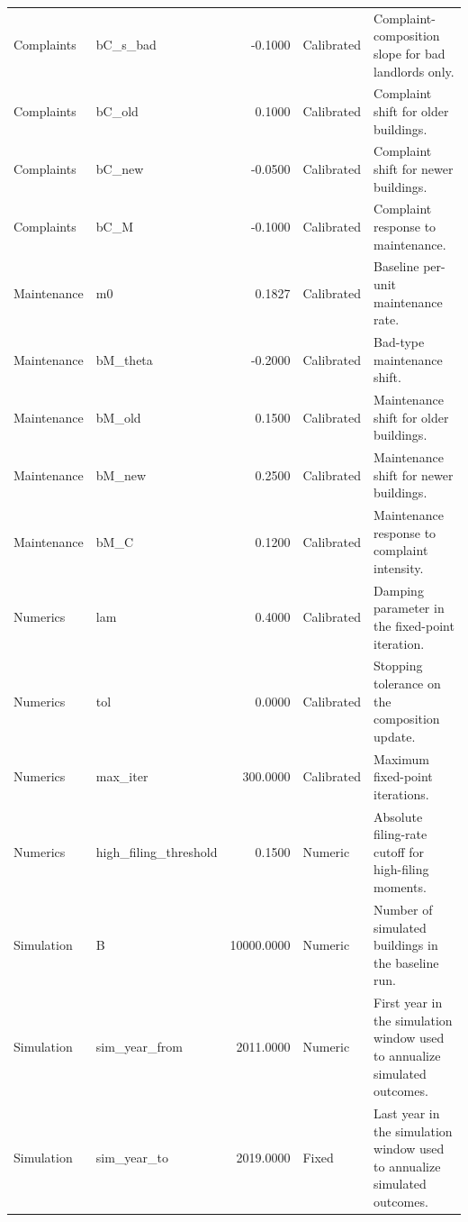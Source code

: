 \begin{table}
\begin{tabular}[t]{llrll}
Complaints & bC\_s\_bad & -0.1000 & Calibrated & Complaint-composition slope for bad landlords only.\\
Complaints & bC\_old & 0.1000 & Calibrated & Complaint shift for older buildings.\\
Complaints & bC\_new & -0.0500 & Calibrated & Complaint shift for newer buildings.\\
Complaints & bC\_M & -0.1000 & Calibrated & Complaint response to maintenance.\\
Maintenance & m0 & 0.1827 & Calibrated & Baseline per-unit maintenance rate.\\
Maintenance & bM\_theta & -0.2000 & Calibrated & Bad-type maintenance shift.\\
Maintenance & bM\_old & 0.1500 & Calibrated & Maintenance shift for older buildings.\\
Maintenance & bM\_new & 0.2500 & Calibrated & Maintenance shift for newer buildings.\\
Maintenance & bM\_C & 0.1200 & Calibrated & Maintenance response to complaint intensity.\\
Numerics & lam & 0.4000 & Calibrated & Damping parameter in the fixed-point iteration.\\
Numerics & tol & 0.0000 & Calibrated & Stopping tolerance on the composition update.\\
Numerics & max\_iter & 300.0000 & Calibrated & Maximum fixed-point iterations.\\
Numerics & high\_filing\_threshold & 0.1500 & Numeric & Absolute filing-rate cutoff for high-filing moments.\\
Simulation & B & 10000.0000 & Numeric & Number of simulated buildings in the baseline run.\\
Simulation & sim\_year\_from & 2011.0000 & Numeric & First year in the simulation window used to annualize simulated outcomes.\\
Simulation & sim\_year\_to & 2019.0000 & Fixed & Last year in the simulation window used to annualize simulated outcomes.\\
\bottomrule
\end{tabular}
\end{table}
